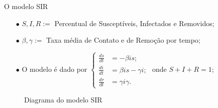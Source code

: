 \documentclass{beamer}
\theoremstyle{plain}
\theoremstyle{definition}
\begin{document}
\begin{frame}{O modelo SIR}
     

    \small
    
    \begin{itemize}
            \item [$\bullet$] $S,I,R :=$ Percentual de Susceptíveis, Infectados e Removidos;
            \item [$\bullet$] $\beta, \gamma := $ Taxa média de Contato e de Remoção por tempo;
            \item [$\bullet$] O modelo é dado por
                $ 
                \begin{cases}
                    \frac{ds}{dt} &= -\beta i s; \\ 
                    \frac{di}{dt} &= \beta i s - \gamma i;  \\
                    \frac{dr}{dt} &= \gamma i \gamma. 
                \end{cases}
                $ 
                onde $S + I + R = 1$;

    \end{itemize}


    \begin{figure}
        \begin{center}
        \end{center}
        \caption{Diagrama do modelo SIR}
    \end{figure}
\end{frame}

\end{document}
